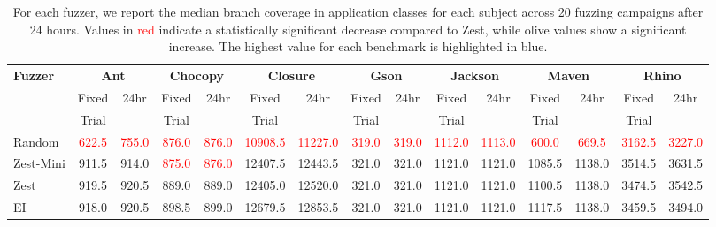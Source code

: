 \begin{table}[t]
    \centering
    \scriptsize
    \setlength{\tabcolsep}{3pt}
    \caption{For each fuzzer, we report the median branch coverage in application classes for each subject across 20 fuzzing campaigns after 24 hours. Values in \textcolor{red}{red} indicate a statistically significant decrease compared to Zest, while \textcolor{\chigher}{olive} values show a significant increase. The highest value for each benchmark is highlighted in blue.}
    \label{tab:cov}
    \begin{tabular}{l|cc|cc|cc|cc|cc|cc|cc}
    \toprule
    \multirow{3}{*}{\textbf{Fuzzer}} & \multicolumn{2}{c|}{\textbf{Ant}} & \multicolumn{2}{c|}{\textbf{Chocopy}} & \multicolumn{2}{c|}{\textbf{Closure}} & \multicolumn{2}{c|}{\textbf{Gson}} & \multicolumn{2}{c|}{\textbf{Jackson}} & \multicolumn{2}{c|}{\textbf{Maven}} & \multicolumn{2}{c}{\textbf{Rhino}}\\
    & Fixed & \multirow{2}{*}{24hr} & Fixed & \multirow{2}{*}{24hr} & Fixed & \multirow{2}{*}{24hr} & Fixed & \multirow{2}{*}{24hr} & Fixed & \multirow{2}{*}{24hr} & Fixed & \multirow{2}{*}{24hr} & Fixed & \multirow{2}{*}{24hr} \\
    & Trial & & Trial & & Trial & & Trial & & Trial & & Trial & & Trial & \\
    \midrule
    Random & \textcolor{red}{622.5} & \textcolor{red}{755.0} & \textcolor{red}{876.0} & \textcolor{red}{876.0} & \textcolor{red}{10908.5} & \textcolor{red}{11227.0} & \textcolor{red}{319.0} & \textcolor{red}{319.0} & \textcolor{red}{1112.0} & \textcolor{red}{1113.0} & \textcolor{red}{600.0} & \textcolor{red}{669.5} & \textcolor{red}{3162.5} & \textcolor{red}{3227.0} \\
    Zest-Mini & 911.5 & 914.0 & \textcolor{red}{875.0} & \textcolor{red}{876.0} & 12407.5 & 12443.5 & \cellcolor{blue!15}321.0 & \cellcolor{blue!15}321.0 & 1121.0 & 1121.0 & 1085.5 & \cellcolor{blue!15}1138.0 & 3514.5 & 3631.5 \\
    Zest & \cellcolor{blue!15}919.5 & \cellcolor{blue!15}920.5 & 889.0 & 889.0 & 12405.0 & 12520.0 & \cellcolor{blue!15}321.0 & \cellcolor{blue!15}321.0 & 1121.0 & 1121.0 & 1100.5 & \cellcolor{blue!15}1138.0 & 3474.5 & 3542.5 \\
    EI & 918.0 & \cellcolor{blue!15}920.5 & \cellcolor{blue!15}\textcolor{\chigher}{898.5} & \cellcolor{blue!15}\textcolor{\chigher}{899.0} & \textcolor{\chigher}{12679.5} & \textcolor{\chigher}{12853.5} & \cellcolor{blue!15}321.0 & \cellcolor{blue!15}321.0 & 1121.0 & 1121.0 & \textcolor{\chigher}{1117.5} & \cellcolor{blue!15}1138.0 & 3459.5 & 3494.0 \\

\end{tabular}
\end{table}

